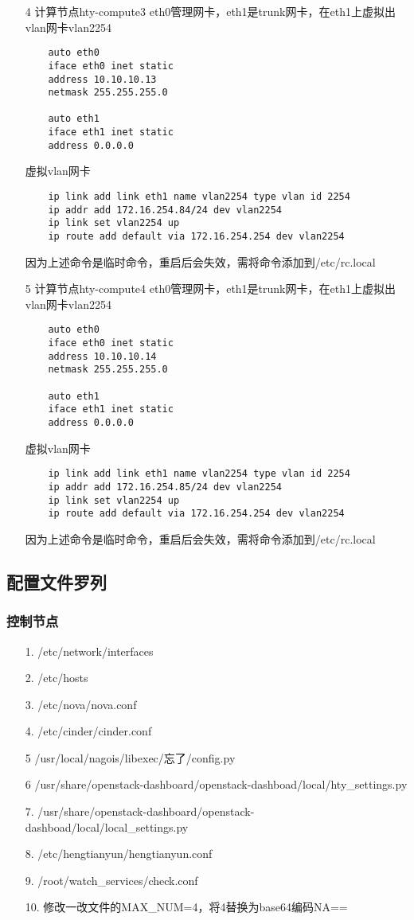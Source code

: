 \documentclass[a4paper,left=1.5cm,right=1.5cm,11pt]{article}
\begin{document}
\begin{itemize}
	\item[4]计算节点hty-compute3
	eth0管理网卡，eth1是trunk网卡，在eth1上虚拟出vlan网卡vlan2254
	\begin{lstlisting}
	auto eth0
	iface eth0 inet static
	address 10.10.10.13
	netmask 255.255.255.0

	auto eth1
	iface eth1 inet static
	address 0.0.0.0
	\end{lstlisting}
	虚拟vlan网卡
	\begin{lstlisting}
	ip link add link eth1 name vlan2254 type vlan id 2254
	ip addr add 172.16.254.84/24 dev vlan2254
	ip link set vlan2254 up 
	ip route add default via 172.16.254.254 dev vlan2254
	\end{lstlisting}
	因为上述命令是临时命令，重启后会失效，需将命令添加到/etc/rc.local

	\item[5]计算节点hty-compute4
	eth0管理网卡，eth1是trunk网卡，在eth1上虚拟出vlan网卡vlan2254
	\begin{lstlisting}
	auto eth0
	iface eth0 inet static
	address 10.10.10.14
	netmask 255.255.255.0

	auto eth1
	iface eth1 inet static
	address 0.0.0.0
	\end{lstlisting}
	虚拟vlan网卡
	\begin{lstlisting}
	ip link add link eth1 name vlan2254 type vlan id 2254
	ip addr add 172.16.254.85/24 dev vlan2254
	ip link set vlan2254 up 
	ip route add default via 172.16.254.254 dev vlan2254
	\end{lstlisting}
	因为上述命令是临时命令，重启后会失效，需将命令添加到/etc/rc.local
\end{itemize}
\subsection{配置文件罗列}
\subsubsection{控制节点}
\begin{itemize}
	\item[1.]/etc/network/interfaces
	\item[2.]/etc/hosts
	\item[3.]/etc/nova/nova.conf
	\item[4.]/etc/cinder/cinder.conf
	\item[5]/usr/local/nagois/libexec/忘了/config.py
	\item[6]/usr/share/openstack-dashboard/openstack-dashboad/local/hty\_settings.py
	\item[7.]/usr/share/openstack-dashboard/openstack-dashboad/local/local\_settings.py
	\item[8.]/etc/hengtianyun/hengtianyun.conf
	\item[9.]/root/watch\_services/check.conf
	\item[10.]修改一改文件的MAX\_NUM=4，将4替换为base64编码NA==
\end{itemize}
\end{document}
